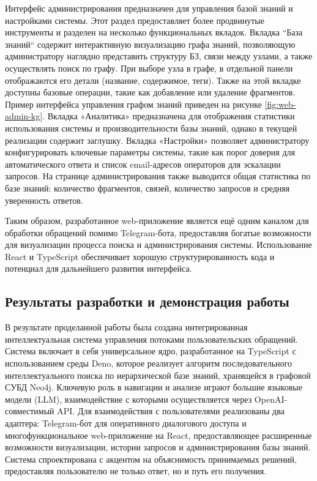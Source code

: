 
Интерфейс администрирования предназначен для управления базой знаний и настройками системы. Этот раздел предоставляет более продвинутые инструменты и разделен на несколько функциональных вкладок. Вкладка ``База знаний`` содержит интерактивную визуализацию графа знаний, позволяющую администратору наглядно представить структуру БЗ, связи между узлами, а также осуществлять поиск по графу. При выборе узла в графе, в отдельной панели отображаются его детали (название, содержимое, теги). Также на этой вкладке доступны базовые операции, такие как добавление или удаление фрагментов. Пример интерфейса управления графом знаний приведен на рисунке \ref{fig:web-admin-kg}. Вкладка «Аналитика» предназначена для отображения статистики использования системы и производительности базы знаний, однако в текущей реализации содержит заглушку. Вкладка «Настройки» позволяет администратору конфигурировать ключевые параметры системы, такие как порог доверия для автоматического ответа и список email-адресов операторов для эскалации запросов. На странице администрирования также выводится общая статистика по базе знаний: количество фрагментов, связей, количество запросов и средняя уверенность ответов.


Таким образом, разработанное web-приложение является ещё одним каналом для обработки обращений помимо Telegram-бота, предоставляя богатые возможности для визуализации процесса поиска и администрирования системы. Использование React и TypeScript обеспечивает хорошую структурированность кода и потенциал для дальнейшего развития интерфейса.

\subsection{Результаты разработки и демонстрация работы}

В результате проделанной работы была создана интегрированная интеллектуальная система управления потоками пользовательских обращений. Система включает в себя универсальное ядро, разработанное на TypeScript с использованием среды Deno, которое реализует алгоритм последовательного интеллектуального поиска по иерархической базе знаний, хранящейся в графовой СУБД Neo4j. Ключевую роль в навигации и анализе играют большие языковые модели (LLM), взаимодействие с которыми осуществляется через OpenAI-совместимый API. Для взаимодействия с пользователями реализованы два адаптера: Telegram-бот для оперативного диалогового доступа и многофункциональное web-приложение на React, предоставляющее расширенные возможности визуализации, истории запросов и администрирования базы знаний. Система спроектирована с акцентом на объяснимость принимаемых решений, предоставляя пользователю не только ответ, но и путь его получения.

